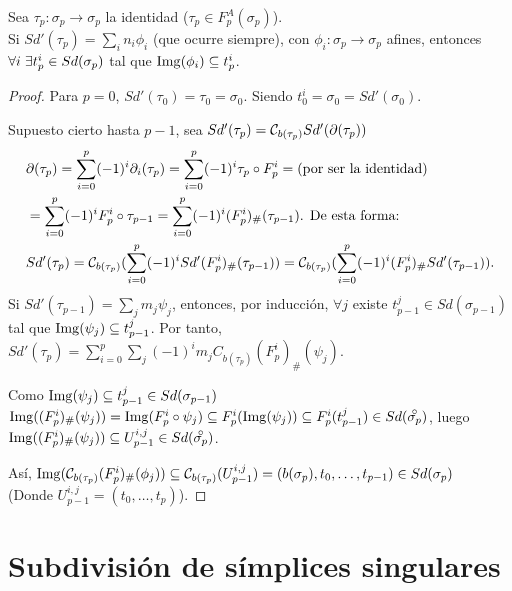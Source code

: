 Sea $\tau_p \colon \sigma_p \to \sigma_p$ la identidad ($\tau_p \in F_p^A(\sigma_p)$). \\
Si $Sd'(\tau_p) = \sum_i n_i \phi_i$ (que ocurre siempre), con $\phi_i \colon \sigma_p \to \sigma_p$ afines, entonces
$\forall i \hspace{0.3em} \exists t_p^i \in Sd(\sigma_p)$ tal que $\operatorname{Img}(\phi_i) \subseteq t_p^i$.

\begin{proof}
  Para $p = 0$, $Sd'(\tau_0) = \tau_0 = \sigma_0$. Siendo $t_0^i = \sigma_0 = Sd'(\sigma_0)$.

  Supuesto cierto hasta $p-1$, sea $Sd'(\tau_p) = {\mathcal C}_{b(\tau_p)} Sd'(\partial(\tau_p))$
  \begin{align*}
    &\partial(\tau_p) = \sum\limits_{i = 0}^p (-1)^i \partial_i(\tau_p) = \sum\limits_{i = 0}^p (-1)^i \tau_p \circ F_p^i = \text{(por ser la identidad)} \\
    &= \sum\limits_{i = 0}^p (-1)^i F_p^i \circ \tau_{p-1} = \sum\limits_{i = 0}^p (-1)^i(F_p^i)_\# (\tau_{p-1}) \text{. De esta forma:} \\
    &Sd'(\tau_p) = {\mathcal C}_{b(\tau_p)}(\sum\limits_{i = 0}^p (-1)^i Sd'(F_p^i)_\# (\tau_{p-1})) = {\mathcal C}_{b(\tau_p)}(\sum\limits_{i = 0}^p (-1)^i(F_p^i)_\# Sd'(\tau_{p-1})).
  \end{align*}
  Si $Sd'(\tau_{p-1}) = \sum\limits_j m_j \psi_j$, entonces, por inducción, $\forall j$ existe $t_{p-1}^j \in Sd(\sigma_{p-1})$ tal que
  $\operatorname{Img}(\psi_j) \subseteq t_{p-1}^j$. Por tanto, $Sd'(\tau_p) = \sum\limits_{i = 0}^p \sum\limits_j (-1)^i m_j C_{b(\tau_p)}(F_p^i)_\# (\psi_j)$.

  Como $\operatorname{Img}(\psi_j) \subseteq t_{p-1}^j \in Sd(\sigma_{p-1})$
  $\Img((F_p^i)_\# (\psi_j)) = \Img(F_p^i \circ \psi_j) \subseteq F_p^i(\Img(\psi_j)) \subseteq F_p^i(t_{p-1}^j) \in Sd(\interior{\sigma_p})$,
  luego $\Img((F_p^i)_\# (\psi_j)) \subseteq U_{p-1}^{i,j} \in Sd(\interior{\sigma_p})$.

  Así, $\operatorname{Img}({\mathcal C}_{b(\tau_p)}(F_p^i)_\# (\phi_j)) \subseteq {\mathcal C}_{b(\tau_p)}(U_{p-1}^{i, j}) = (b(\sigma_p), t_0, \dots, t_{p-1}) \in Sd(\sigma_p)$\\
  (Donde $U_{p-1}^{i,j} = (t_0, \dots, t_p)$).
\end{proof}

\section{Subdivisión de símplices singulares}


